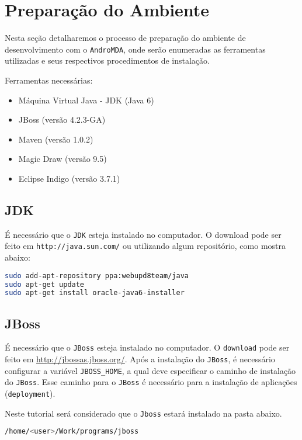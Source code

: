 \chapter{Preparação do Ambiente}

Nesta seção detalharemos o processo de preparação do ambiente de desenvolvimento
com o \texttt{AndroMDA}, onde serão enumeradas as ferramentas utilizadas e seus
respectivos procedimentos de instalação.

Ferramentas necessárias:
\begin{itemize}
  \item Máquina Virtual Java - JDK (Java 6)
  \item JBoss (versão 4.2.3-GA)
  \item Maven (versão 1.0.2) 
  \item Magic Draw (versão 9.5)
  \item Eclipse Indigo (versão 3.7.1)
\end{itemize}

\section{JDK}

É necessário que o \texttt{JDK} esteja instalado no computador. O
download pode ser feito em \texttt{http://java.sun.com/} ou utilizando
algum repositório, como mostra abaixo:

\begin{lstlisting}[language=bash]
sudo add-apt-repository ppa:webupd8team/java
sudo apt-get update
sudo apt-get install oracle-java6-installer
\end{lstlisting}

\section{JBoss}

É necessário que o \texttt{JBoss} esteja instalado no computador. O
\texttt{download} pode ser feito em
\href{http://jbossas.jboss.org/}{http://jbossas.jboss.org/}. Após a
instalação do \texttt{JBoss}, é necessário configurar a variável
\texttt{JBOSS\_HOME}, a qual deve especificar o caminho de instalação do
\texttt{JBoss}. Esse caminho para o \texttt{JBoss} é necessário para a
instalação de aplicações (\texttt{deployment}).

Neste tutorial será considerado que o \texttt{Jboss} estará instalado na pasta
abaixo.

\begin{lstlisting}[language=bash]
/home/<user>/Work/programs/jboss
\end{lstlisting}

